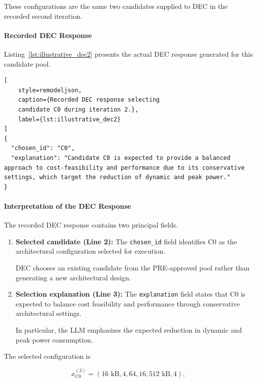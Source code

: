 These configurations are the same two
candidates supplied to DEC in the
recorded second iteration.

\paragraph{Recorded DEC Response}

Listing~\ref{lst:illustrative_dec2}
presents the actual DEC response
generated for this candidate pool.

\begin{lstlisting}[
    style=remodeljson,
    caption={Recorded DEC response selecting
    candidate C0 during iteration 2.},
    label={lst:illustrative_dec2}
]
{
  "chosen_id": "C0",
  "explanation": "Candidate C0 is expected to provide a balanced approach to cost-feasibility and performance due to its conservative settings, which target the reduction of dynamic and peak power."
}
\end{lstlisting}

\paragraph{Interpretation of the DEC Response}

The recorded DEC response contains two
principal fields.

\begin{enumerate}

\item \textbf{Selected candidate (Line 2):}
The \texttt{chosen\_id} field identifies
C0 as the architectural configuration
selected for execution.

DEC chooses an existing candidate from
the PRE-approved pool rather than
generating a new architectural design.

\item \textbf{Selection explanation (Line 3):}
The \texttt{explanation} field states
that C0 is expected to balance cost
feasibility and performance through
conservative architectural settings.

In particular, the LLM emphasizes
the expected reduction in dynamic
and peak power consumption.

\end{enumerate}

The selected configuration is

\begin{equation}
x_{\mathrm{C0}}^{(2)}
=
(
16\text{ kB},
4,
64,
16,
512\text{ kB},
4
),
\label{eq:illustrative_dec2_design}
\end{equation}

